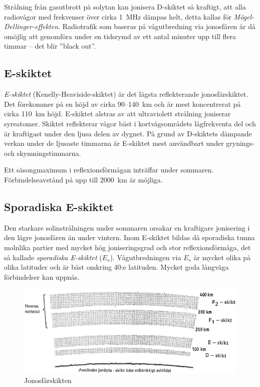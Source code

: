 Strålning från gasutbrott på solytan kan jonisera D-skiktet så
kraftigt, att alla radiovågor med frekvenser över cirka 1~MHz dämpas helt,
detta kallas för \emph{Mögel-Dellinger-effekten}.
Radiotrafik som baseras på vågutbredning via jonosfären är då
omöjlig att genomföra under en tidsrymd av ett antal minuter upp till
flera timmar -- det blir ''black out''.

\subsection{E-skiktet}

\emph{E-skiktet} (Kenelly-Heaviside-skiktet) är det lägsta reflekterande
jonosfärskiktet.
Det förekommer på en höjd av cirka 90--140~km och är mest koncentrerat på
cirka 110~km höjd.
E-skiktet alstras av att ultraviolett strålning joniserar syreatomer.
Skiktet reflekterar vågor bäst i kortvågsområdets lågfrekventa del och är
kraftigast under den ljusa delen av dygnet.
På grund av D-skiktets dämpande verkan under de ljusaste timmarna är E-skiktet
mest användbart under grynings- och skymningstimmarna.

Ett säsongmaximum i reflexionsförmågan inträffar under sommaren.
Förbindelseavstånd på upp till 2000~km är möjliga.

\subsection{Sporadiska E-skiktet}

Den starkare solinstrålningen under sommaren orsakar en kraftigare
jonisering i den lägre jonosfären än under vintern.
Inom E-skiktet bildas då sporadiska tunna molnlika partier med mycket hög
joniseringsgrad och stor reflexionsförmåga, det så kallade \emph{sporadiska
E-skiktet} (\(E_s\)).
Vågutbredningen via \(E_s\) är mycket olika på olika latituder och är bäst
omkring 40:e latituden.
Mycket goda långväga förbindelser kan uppnås.

\begin{figure}
  \includegraphics[width=\textwidth]{images/cropped_pdfs/bild_2_7-07.pdf}
  \caption{Jonosfärskikten}
  \label{fig:bildII7-7}
\end{figure}

